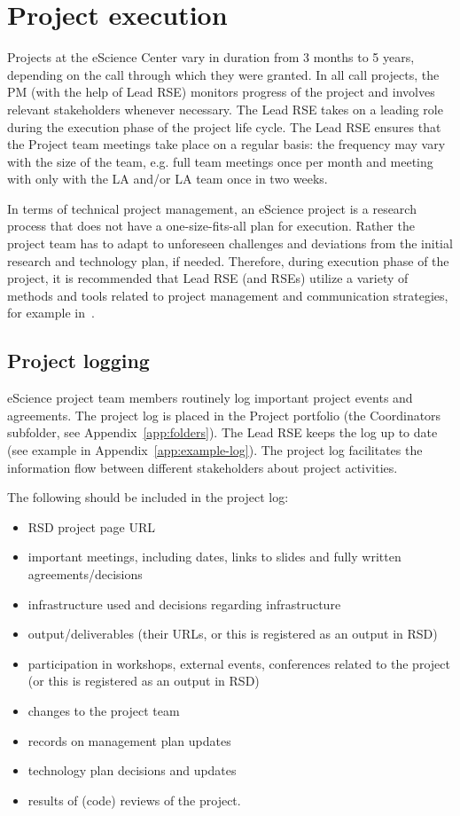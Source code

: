 \section{Project execution}
Projects at the eScience Center vary in duration from 3 months to 5 years, depending on the call through which they were
granted. In all call projects, the PM (with the help of Lead RSE) monitors progress of the project and involves
relevant stakeholders whenever necessary. The Lead RSE takes on a leading role during the execution phase of the
project life cycle. The Lead RSE ensures that the Project team meetings take place on a regular basis: the frequency
may vary with the size of the team, e.g. full team meetings once per month and meeting with only with the LA and/or LA
team once in two weeks.

In terms of technical project management, an eScience project is a research process that does not have a one-size-fits-all plan for execution. Rather the project 
team has to adapt to unforeseen challenges and deviations from the initial research and technology plan, if needed. Therefore, 
during execution phase of the project, it is recommended that Lead RSE (and RSEs) utilize a variety of methods and tools 
related to project management and communication strategies, for example in~\cite{the_turing_way-2023,microp3,scrum-guide}.

\subsection{Project logging}
\label{sec:exec:log}
eScience project team members routinely log important project events and agreements. The project log is placed in the
Project portfolio (the Coordinators subfolder, see Appendix~\ref{app:folders}). The Lead RSE keeps the log up to
date (see example in Appendix~\ref{app:example-log}). The project log facilitates the information flow between
different stakeholders about project activities.

The following should be included in the project log:
\begin{itemize}[itemsep=-4pt,parsep=4pt]
\item RSD project page URL
\item important meetings, including dates, links to slides and fully written agreements/decisions
\item infrastructure used and decisions regarding infrastructure
\item output/deliverables (their URLs, or this is registered as an output in RSD)
\item participation in workshops, external events, conferences related to the project (or this is registered as an output in
RSD)
\item changes to the project team
\item records on management plan updates
\item technology plan decisions and updates
\item results of (code) reviews of the project.
\end{itemize}

